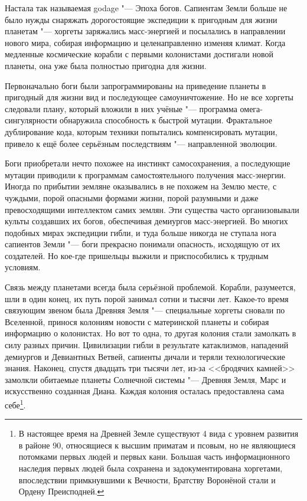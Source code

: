 Настала так называемая godage "--- Эпоха богов.
Сапиентам Земли больше не было нужды снаряжать дорогостоящие экспедиции к пригодным для жизни планетам "--- хоргеты заряжались масс-энергией и посылались в направлении нового мира, собирая информацию и целенаправленно изменяя климат.
Когда медленные космические корабли с первыми колонистами достигали новой планеты, она уже была полностью пригодна для жизни.

Первоначально боги были запрограммированы на приведение планеты в пригодный для жизни вид и последующее самоуничтожение.
Но не все хоргеты следовали плану, который вложили в них учёные "--- программа омега-сингулярности обнаружила способность к быстрой мутации.
Фрактальное дублирование кода, которым техники попытались компенсировать мутации, привело к ещё более серьёзным последствиям "--- направленной эволюции.

Боги приобретали нечто похожее на инстинкт самосохранения, а последующие мутации приводили к программам самостоятельного получения масс-энергии.
Иногда по прибытии земляне оказывались в не похожем на Землю месте, с чуждыми, порой опасными формами жизни, порой разумными и даже превосходящими интеллектом самих землян.
Эти существа часто организовывали культы создавших их богов, обеспечивая демиургов масс-энергией.
Во многих подобных мирах экспедиции гибли, и туда больше никогда не ступала нога сапиентов Земли "--- боги прекрасно понимали опасность, исходящую от их создателей.
Но кое-где пришельцы выжили и приспособились к трудным условиям.

Связь между планетами всегда была серьёзной проблемой.
Корабли, разумеется, шли в один конец, их путь порой занимал сотни и тысячи лет.
Какое-то время связующим звеном была Древняя Земля "--- специальные хоргеты сновали по Вселенной, принося колониям новости с материнской планеты и собирая информацию о колонистах.
Но вот то одна, то другая колония стали замолкать в силу разных причин.
Цивилизации гибли в результате катаклизмов, нападений демиургов и Девиантных Ветвей, сапиенты дичали и теряли технологические знания.
Наконец, спустя двадцать три тысячи лет, из-за <<бродячих камней>> замолкли обитаемые планеты Солнечной системы "--- Древняя Земля, Марс и искусственно созданная Диана.
Каждая колония осталась предоставлена сама себе\footnote
{В настоящее время на Древней Земле существуют 4 вида с уровнем развития в районе 90, относящиеся к высшим приматам и псовым, но не являющиеся потомками первых людей и первых кани.
Большая часть информационного наследия первых людей была сохранена и задокументирована хоргетами, впоследствии примкнувшими к Вечности, Братству Воронёной стали и Ордену Преисподней. \authornote}.


